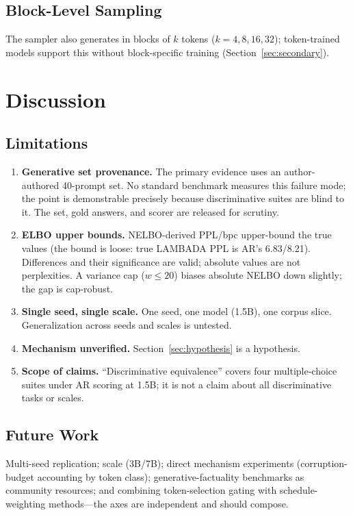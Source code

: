 \documentclass{article}
\begin{document}
\subsection{Block-Level Sampling}

The sampler also generates in blocks of $k$ tokens ($k = 4, 8, 16, 32$);
token-trained models support this without block-specific training
(Section~\ref{sec:secondary}).


\section{Discussion}

\subsection{Limitations}

\begin{enumerate}
    \item \textbf{Generative set provenance.} The primary evidence uses an
    author-authored 40-prompt set. No standard benchmark measures this failure mode;
    the point is demonstrable precisely because discriminative suites are blind to it.
    The set, gold answers, and scorer are released for scrutiny.
    \item \textbf{ELBO upper bounds.} NELBO-derived PPL/bpc upper-bound the true
    values (the bound is loose: true LAMBADA PPL is AR's 6.83/8.21). Differences and
    their significance are valid; absolute values are not perplexities. A variance cap
    ($w \le 20$) biases absolute NELBO down slightly; the gap is cap-robust.
    \item \textbf{Single seed, single scale.} One seed, one model (1.5B), one corpus
    slice. Generalization across seeds and scales is untested.
    \item \textbf{Mechanism unverified.} Section~\ref{sec:hypothesis} is a hypothesis.
    \item \textbf{Scope of claims.} ``Discriminative equivalence'' covers four
    multiple-choice suites under AR scoring at 1.5B; it is not a claim about all
    discriminative tasks or scales.
\end{enumerate}

\subsection{Future Work}

Multi-seed replication; scale (3B/7B); direct mechanism experiments (corruption-budget
accounting by token class); generative-factuality benchmarks as community resources;
and combining token-selection gating with schedule-weighting methods---the axes are
independent and should compose.
\end{document}
